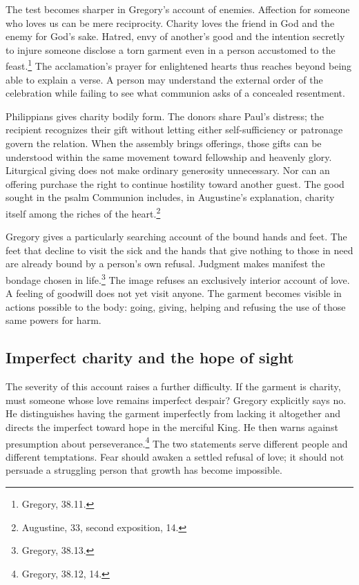 The test becomes sharper in Gregory's account of enemies. Affection for someone who loves us can be mere reciprocity. Charity loves the friend in God and the enemy for God's sake. Hatred, envy of another's good and the intention secretly to injure someone disclose a torn garment even in a person accustomed to the feast.\footnote{Gregory,  38.11.} The acclamation's prayer for enlightened hearts thus reaches beyond being able to explain a verse. A person may understand the external order of the celebration while failing to see what communion asks of a concealed resentment.

Philippians gives charity bodily form. The donors share Paul's distress; the recipient recognizes their gift without letting either self-sufficiency or patronage govern the relation. When the assembly brings offerings, those gifts can be understood within the same movement toward fellowship and heavenly glory. Liturgical giving does not make ordinary generosity unnecessary. Nor can an offering purchase the right to continue hostility toward another guest. The good sought in the psalm Communion includes, in Augustine's explanation, charity itself among the riches of the heart.\footnote{Augustine,  33, second exposition, 14.}

Gregory gives a particularly searching account of the bound hands and feet. The feet that decline to visit the sick and the hands that give nothing to those in need are already bound by a person's own refusal. Judgment makes manifest the bondage chosen in life.\footnote{Gregory,  38.13.} The image refuses an exclusively interior account of love. A feeling of goodwill does not yet visit anyone. The garment becomes visible in actions possible to the body: going, giving, helping and refusing the use of those same powers for harm.

\subsection{Imperfect charity and the hope of sight}
The severity of this account raises a further difficulty. If the garment is charity, must someone whose love remains imperfect despair? Gregory explicitly says no. He distinguishes having the garment imperfectly from lacking it altogether and directs the imperfect toward hope in the merciful King. He then warns against presumption about perseverance.\footnote{Gregory,  38.12, 14.} The two statements serve different people and different temptations. Fear should awaken a settled refusal of love; it should not persuade a struggling person that growth has become impossible.

